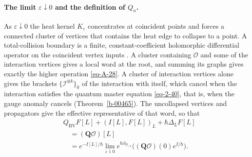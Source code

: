 \documentclass[11pt]{article}
\numberwithin{equation}{section}
\numberwithin{figure}{section}
\numberwithin{table}{section}
\begin{document}
\paragraph{The limit $\varepsilon\downarrow0$ and the definition of $Q_n$.}

As $\varepsilon\downarrow0$ the heat kernel $K_\varepsilon$ concentrates at coincident points and forces a connected cluster of vertices that contains the heat edge to collapse to a point. A total-collision boundary is a finite, constant-coefficient holomorphic differential operator on the coincident vertex inputs \cite[Theorem 6]{Wang}. A cluster containing $\mathcal O$ and some of the interaction vertices gives a local word at the root, and summing its graphs gives exactly the higher operation \eqref{eq-A-28}. A cluster of interaction vertices alone gives the brackets $\{\mathcal I^{\otimes k}\}_0$ of the interaction with itself, which cancel when the interaction satisfies the quantum master equation \eqref{eq-2-40}, that is, when the gauge anomaly cancels (Theorem~\ref{b-00465}). The uncollapsed vertices and propagators give the effective representative of that word, so that
\begin{equation}\label{eq-C-local-Ward-identity}
\begin{aligned}
&Q_{\mathrm{BV}}F[L]+(I[L],F[L])_L+\hbar\Delta_LF[L]\\
&\quad=(\mathbf Q\mathcal O)[L]\\
&\quad=e^{-I[L]/\hbar}\lim_{\varepsilon\downarrow0}
 e^{\hbar\partial_{P_{\varepsilon,L}}}
 \bigl((\mathbf Q\mathcal O)(0)e^{I/\hbar}\bigr).
\end{aligned}
\end{equation}
\end{document}
